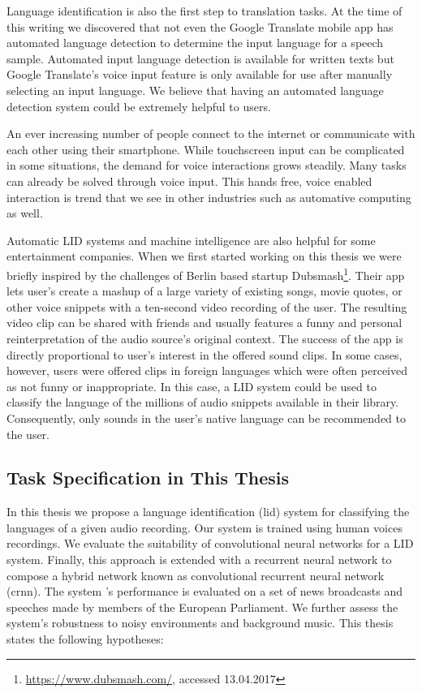 Language identification is also the first step to translation tasks. At the time of this writing we discovered that not even the Google Translate mobile app has automated language detection to determine the input language for a speech sample. Automated input language detection is available for written texts but Google Translate's voice input feature is only available for use after manually selecting an input language. We believe that having an automated language detection system could be extremely helpful to users. 

An ever increasing number of people connect to the internet or communicate with each other using their smartphone. While touchscreen input can be complicated in some situations, the demand for voice interactions grows steadily. Many tasks can already be solved through voice input. This hands free, voice enabled interaction is trend that we see in other industries such as automative computing as well.

Automatic LID systems and machine intelligence are also helpful for some entertainment companies. When we first started working on this thesis we were briefly inspired by the challenges of Berlin based startup Dubsmash\footnote{\url{https://www.dubsmash.com/}, accessed 13.04.2017}. Their app lets user's create a mashup of a large variety of existing songs, movie quotes, or other voice snippets with a ten-second video recording of the user. The resulting video clip can be shared with friends and usually features a funny and personal reinterpretation of the audio source's original context. The success of the app is directly proportional to user's interest in the offered sound clips. In some cases, however, users were offered clips in foreign languages which were often perceived as not funny or inappropriate. In this case, a LID system could be used to classify the language of the millions of audio snippets available in their library. Consequently, only sounds in the user's native language can be recommended to the user.


\subsection{Task Specification in This Thesis}
In this thesis we propose a language identification (\ac{lid}) system for classifying the languages of a given audio recording. Our system is trained using human voices recordings. We evaluate the suitability of convolutional neural networks for a LID system. Finally, this approach is extended with a recurrent neural network to compose a hybrid network known as convolutional recurrent neural network (\ac{crnn}). The system 's performance is evaluated on a set of news broadcasts and speeches made by members of the European Parliament. We further assess the system's robustness to noisy environments and background music. This thesis states the following hypotheses:

